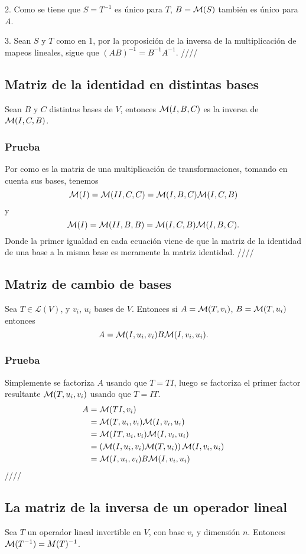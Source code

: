 \documentclass{article}
\begin{document}
2. Como se tiene que $S=T^{-1}$ es único para $T$, $B=\mathcal{M}(S)$ también
es único para $A$.

3. Sean $S$ y $T$ como en 1, por la proposición de la inversa
de la multiplicación de mapeos lineales, sigue que
$(AB)^{-1} = B^{-1}A^{-1}$.
\hfill ////

\subsection{Matriz de la identidad en distintas bases}
Sean $B$ y $C$ distintas bases de $V$, entonces
$\mathcal{M}(I,B,C)$ es la inversa de\\
$\mathcal{M}(I,C,B)$.
\subsubsection*{Prueba}
Por como es la matriz de una multiplicación de transformaciones,
tomando en cuenta sus bases, tenemos
$$\mathcal{M}(I)=\mathcal{M}(II,C,C) = \mathcal{M}(I,B,C) \mathcal{M}(I,C,B)$$
y
$$\mathcal{M}(I)=\mathcal{M}(II,B,B) = \mathcal{M}(I,C,B) \mathcal{M}(I,B,C).$$
Donde la primer igualdad en cada ecuación viene de que la matriz
de la identidad de una base a la misma base es meramente la matriz
identidad. \hfill ////
\newpage

\subsection{Matriz de cambio de bases}
Sea $T\in\mathcal{L}(V)$, y $v_i$, $u_i$ bases de $V$.
Entonces si $A=\mathcal{M}(T,v_i)$, $B=\mathcal{M}(T,u_i)$
entonces
$$A=\mathcal{M}(I,u_i, v_i)B\mathcal{M}(I,v_i,u_i).$$
\subsubsection*{Prueba}
Simplemente se factoriza $A$ usando que $T=TI$,
luego se factoriza el primer factor resultante $\mathcal{M}(T, u_i, v_i)$
usando que $T=IT$.
\begin{align*}
    A&=\mathcal{M}(TI,v_i)\\
    &=\mathcal{M}(T, u_i, v_i)\mathcal{M}(I, v_i, u_i)\\
    &=\mathcal{M}(IT, u_i, v_i)\mathcal{M}(I, v_i, u_i)\\
    &=\left(\mathcal{M}(I, u_i, v_i)\mathcal{M}(T,u_i)\right)\mathcal{M}(I, v_i, u_i)\\
    &=\mathcal{M}(I, u_i, v_i)B\mathcal{M}(I, v_i, u_i)
\end{align*}
\hfill ////

\subsection{La matriz de la inversa de un operador lineal}
Sea $T$ un operador lineal invertible en $V$, con base $v_i$ y
dimensión $n$. Entonces $\mathcal{M}(T^{-1}) = M(T)^{-1}$.
\end{document}
